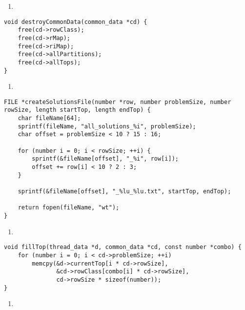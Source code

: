 \begin{enumerate}
\addtocounter{enumi}{1}
\item 
\end{enumerate}

\begin{lstlisting}[caption={},label={destroyCommonData}]
void destroyCommonData(common_data *cd) {
    free(cd->rowClass);
    free(cd->rMap);
    free(cd->riMap);
    free(cd->allPartitions);
    free(cd->allTops);
}
\end{lstlisting}

\begin{enumerate}
\addtocounter{enumi}{1}
\item 
\end{enumerate}

\begin{lstlisting}[caption={},label={createSolutionsFile}]
FILE *createSolutionsFile(number *row, number problemSize, number rowSize, length startTop, length endTop) {
    char fileName[64];
    sprintf(fileName, "all_solutions_%i", problemSize);
    char offset = problemSize < 10 ? 15 : 16;

    for (number i = 0; i < rowSize; ++i) {
        sprintf(&fileName[offset], "_%i", row[i]);
        offset += row[i] < 10 ? 2 : 3;
    }

    sprintf(&fileName[offset], "_%lu_%lu.txt", startTop, endTop);

    return fopen(fileName, "wt");
}
\end{lstlisting}

\begin{enumerate}
\addtocounter{enumi}{1}
\item 
\end{enumerate}

\begin{lstlisting}[caption={},label={fillTop}]
void fillTop(thread_data *d, common_data *cd, const number *combo) {
    for (number i = 0; i < cd->problemSize; ++i)
        memcpy(&d->currentTop[i * cd->rowSize],
               &cd->rowClass[combo[i] * cd->rowSize],
               cd->rowSize * sizeof(number));
}
\end{lstlisting}

\begin{enumerate}
\addtocounter{enumi}{1}
\item 
\end{enumerate}

